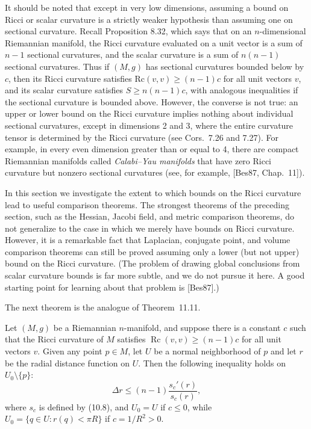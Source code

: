 It should be noted that except in very low dimensions, assuming a bound on Ricci or scalar curvature is a strictly weaker hypothesis than assuming one on sectional curvature. Recall Proposition 8.32, which says that on an $n$-dimensional Riemannian manifold, the Ricci curvature evaluated on a unit vector is a sum of $n - 1$ sectional curvatures, and the scalar curvature is a sum of $n(n-1)$ sectional curvatures. Thus if $(M,g)$ has sectional curvatures bounded below by $c$, then its Ricci curvature satisfies $\text{Rc}(v,v) \ge (n-1)c$ for all unit vectors $v$, and its scalar curvature satisfies $S \ge n(n-1)c$, with analogous inequalities if the sectional curvature is bounded above. However, the converse is not true: an upper or lower bound on the Ricci curvature implies nothing about individual sectional curvatures, except in dimensions 2 and 3, where the entire curvature tensor is determined by the Ricci curvature (see Cors.~7.26 and 7.27). For example, in every even dimension greater than or equal to 4, there are compact Riemannian manifolds called \emph{Calabi--Yau manifolds} that have zero Ricci curvature but nonzero sectional curvatures (see, for example, [Bes87, Chap.~11]).

In this section we investigate the extent to which bounds on the Ricci curvature lead to useful comparison theorems. The strongest theorems of the preceding section, such as the Hessian, Jacobi field, and metric comparison theorems, do not generalize to the case in which we merely have bounds on Ricci curvature. However, it is a remarkable fact that Laplacian, conjugate point, and volume comparison theorems can still be proved assuming only a lower (but not upper) bound on the Ricci curvature. (The problem of drawing global conclusions from scalar curvature bounds is far more subtle, and we do not pursue it here. A good starting point for learning about that problem is [Bes87].)

The next theorem is the analogue of Theorem~11.11.

\begin{theorem}
\label{thm:laplacian-comparison-ii}

Let $(M, g)$ be a Riemannian $n$-manifold, and suppose there is a constant $c$ such that the Ricci curvature of $M$ satisfies $\operatorname{Rc}(v, v) \geq (n-1)c$ for all unit vectors $v$. Given any point $p \in M$, let $U$ be a normal neighborhood of $p$ and let $r$ be the radial distance function on $U$. Then the following inequality holds on $U_0 \setminus \{p\}$:
\begin{equation}
\Delta r \le (n-1) \frac{s_c'(r)}{s_c(r)},
\tag{11.27}
\end{equation}
where $s_c$ is defined by (10.8), and $U_0 = U$ if $c \le 0$, while $U_0 = \{q \in U : r(q) < \pi R\}$ if $c = 1/R^2 > 0$.
\end{theorem}

